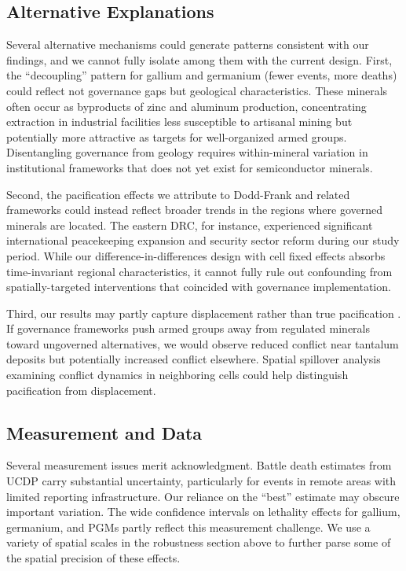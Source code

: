 \documentclass[11pt]{article}
\begin{document}
\subsection{Alternative Explanations}

Several alternative mechanisms could generate patterns consistent with our findings, and we cannot fully isolate among them with the current design. First, the ``decoupling'' pattern for gallium and germanium (fewer events, more deaths) could reflect not governance gaps but geological characteristics. These minerals often occur as byproducts of zinc and aluminum production, concentrating extraction in industrial facilities less susceptible to artisanal mining but potentially more attractive as targets for well-organized armed groups. Disentangling governance from geology requires within-mineral variation in institutional frameworks that does not yet exist for semiconductor minerals.

Second, the pacification effects we attribute to Dodd-Frank and related frameworks could instead reflect broader trends in the regions where governed minerals are located. The eastern DRC, for instance, experienced significant international peacekeeping expansion and security sector reform during our study period. While our difference-in-differences design with cell fixed effects absorbs time-invariant regional characteristics, it cannot fully rule out confounding from spatially-targeted interventions that coincided with governance implementation.

Third, our results may partly capture displacement rather than true pacification \citep{berman2017spillover}. If governance frameworks push armed groups away from regulated minerals toward ungoverned alternatives, we would observe reduced conflict near tantalum deposits but potentially increased conflict elsewhere. Spatial spillover analysis examining conflict dynamics in neighboring cells could help distinguish pacification from displacement.

\subsection{Measurement and Data}

Several measurement issues merit acknowledgment. Battle death estimates from UCDP carry substantial uncertainty, particularly for events in remote areas with limited reporting infrastructure. Our reliance on the ``best'' estimate may obscure important variation. The wide confidence intervals on lethality effects for gallium, germanium, and PGMs partly reflect this measurement challenge. We use a variety of spatial scales in the robustness section above to further parse some of the spatial precision of these effects. 
\end{document}
